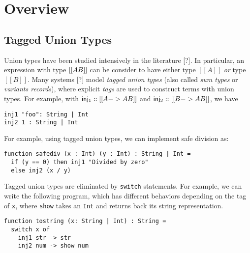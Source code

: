 \section{Overview}
\label{sec:overview}


\subsection{Tagged Union Types}


Union types have been studied intensively in the literature [?]. In particular,
an expression with type $[[A\/B]]$ can be consider to have either type $[[A]]$
\textit{or} type $[[B]]$. Many systems [?] model \textit{tagged union types}
(also called \textit{sum types} or \textit{variants records}),
where explicit \textit{tags} are used to construct terms with union types. For
example, with $\mathsf{inj_1} :: [[A -> A \/ B]]$ and $\mathsf{inj_2} :: [[B ->
A \/ B]]$, we have

\begin{lstlisting}
inj1 "foo": String | Int
inj2 1 : String | Int
\end{lstlisting}

For example, using tagged union types, we can implement safe division as:

\begin{lstlisting}
function safediv (x : Int) (y : Int) : String | Int =
  if (y == 0) then inj1 "Divided by zero"
  else inj2 (x / y)
\end{lstlisting}

Tagged union types are eliminated by \lstinline{switch} statements. For example,
we can write the following program, which has different behaviors depending on the
tag of \lstinline{x}, where \lstinline{show} takes an \lstinline{Int} and
returns back its string representation.


\begin{lstlisting}
function tostring (x: String | Int) : String =
  switch x of
    inj1 str -> str
    inj2 num -> show num
\end{lstlisting}

